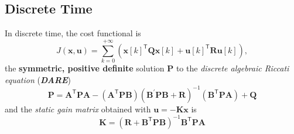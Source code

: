 \subsection{Discrete Time}
In discrete time, the cost functional is
\noindent\begin{equation*}
    J(\mathbf{x,u})=\sum_{k=0}^{+\infty}\left({\mathbf{x}[k]}^{\mathsf{T}} \mathbf{Qx}[k]+{\mathbf{u}[k]}^{\mathsf{T}} \mathbf{Ru}[k]\right),
\end{equation*}
the \textbf{symmetric, positive definite} solution $\mathbf{P}$ to the \textit{discrete algebraic Riccati equation} (\textbf{\textit{DARE}})
\noindent\begin{equation*}
    \mathbf{P}=\mathbf{A}^{\mathsf{T}} \mathbf{PA}-(\mathbf{A}^{\mathsf{T}} \mathbf{PB}){(\mathbf{B}^{\prime}\mathbf{PB}+\mathbf{R})}^{-1}(\mathbf{B}^{\mathsf{T}} \mathbf{PA})+\mathbf{Q}
\end{equation*}
and the \textit{static gain matrix} obtained with $\mathbf{u} = -\mathbf{Kx}$ is
\noindent\begin{equation*}
    \mathbf{K}={(\mathbf{R}+\mathbf{B}^{\mathsf{T}} \mathbf{PB})}^{-1}\mathbf{B}^{\mathsf{T}} \mathbf{PA}
\end{equation*}

\textbf{} 

